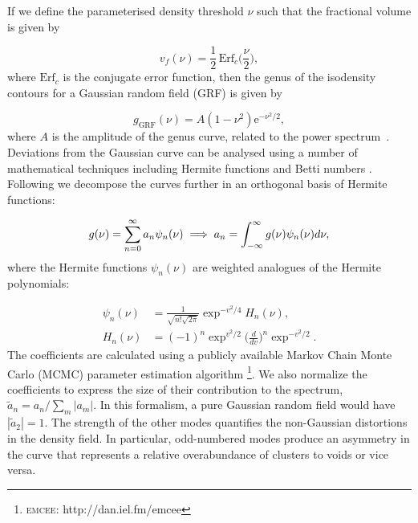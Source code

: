 \documentclass[a4paper,fleqn,usenatbib]{mnras}
\begin{document}
If we define the parameterised density threshold $\nu$ such that the fractional volume is given by

\begin{equation}
\label{fracvol}
v_f (\nu) = \frac{1}{2} \, \mathrm{Erf}_c \Big( \frac{\nu}{2} \Big),
\end{equation}
where $\mathrm{Erf}_c$ is the conjugate error function, then the genus of the isodensity contours for a Gaussian random field (GRF) is given by 

\begin{equation}
\label{genuscurve}
g_{\mathrm{GRF}}(\nu) = A (1-{\nu}^2)\mathrm{e}^{-{\nu}^2/2},
\end{equation}
where $A$ is the amplitude of the genus curve, related to the power spectrum~\citep{1986ApJ...304...15B}.
Deviations from the Gaussian curve can be analysed using a number of mathematical techniques including Hermite functions \citep{2012ApJ...751...40J} and Betti numbers \citep{2013JKAS...46..125P}.
Following \citet{2012ApJ...751...40J} we decompose the curves further in an orthogonal basis of Hermite functions:

\begin{equation}
g(\nu) = \displaystyle\sum_{n=0}^{\infty} a_n \psi_n(\nu) \\
\implies a_n = \int_{-\infty}^{\infty} g(\nu) \psi_n(\nu) d\nu,
\end{equation}
where the Hermite functions $\psi_n(\nu)$ are weighted analogues of the Hermite polynomials: 

\begin{align}
\psi_n(\nu) &= \frac{1}{\sqrt{n!\sqrt{2\pi}}}\exp^{-v^2/4} H_n(\nu), \\
H_n(\nu) &= (-1)^n \exp^{v^2/2} \Big( \frac{d}{dv} \Big)^n \exp^{-v^2/2}. \label{hermeqn}
\end{align}
The coefficients are calculated using a publicly available Markov Chain Monte Carlo (MCMC) parameter estimation algorithm \citep{2013PASP..125..306F}\footnote{\textsc{emcee}: http://dan.iel.fm/emcee}. We also normalize the coefficients to express the size of their contribution to the spectrum, $\tilde{a}_n = a_n/\sum_m |a_m|$. In this formalism, a pure Gaussian random field would have $|\tilde{a}_2|=1$. The strength of the other modes quantifies the non-Gaussian distortions in the density field. In particular, odd-numbered modes produce an asymmetry in the curve that represents a relative overabundance of clusters to voids or vice versa. 

\end{document}
